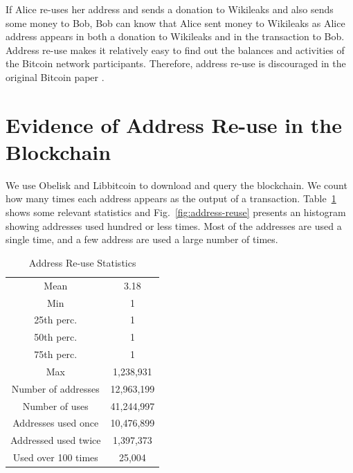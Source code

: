 \documentclass[journal]{IEEEtran}
\begin{document}
If Alice re-uses her address and sends a donation to Wikileaks and also sends some money to Bob, Bob can know that Alice sent money to Wikileaks as Alice address appears in both a donation to Wikileaks and in the transaction to Bob.
Address re-use makes it relatively easy to find out the balances and activities of the Bitcoin network participants.
Therefore, address re-use is discouraged in the original Bitcoin paper \cite{nakamoto2008bpp}.

\section{Evidence of Address Re-use in the Blockchain}

We use Obelisk and Libbitcoin to download and query the blockchain.
We count how many times each address appears as the output of a transaction.
Table~\ref{tab:address-reuse} shows some relevant statistics and Fig.~\ref{fig:address-reuse} presents an histogram showing addresses used hundred or less times.
Most of the addresses are used a single time, and a few address are used a large number of times.


\begin{table}[!t]
\renewcommand{\arraystretch}{1.3}
\caption{Address Re-use Statistics}
\label{tab:address-reuse}
\centering
\begin{tabular}{|cc|}
\hline
Mean & 3.18\\
Min & 1\\
25th perc. & 1 \\
50th perc. & 1 \\
75th perc. & 1 \\
Max & 1,238,931\\
Number of addresses & 12,963,199 \\
Number of uses & 41,244,997 \\
Addresses used once & 10,476,899 \\
Addressed used twice & 1,397,373\\
Used over 100 times & 25,004 \\
\hline
\end{tabular}
\end{table}
\end{document}
